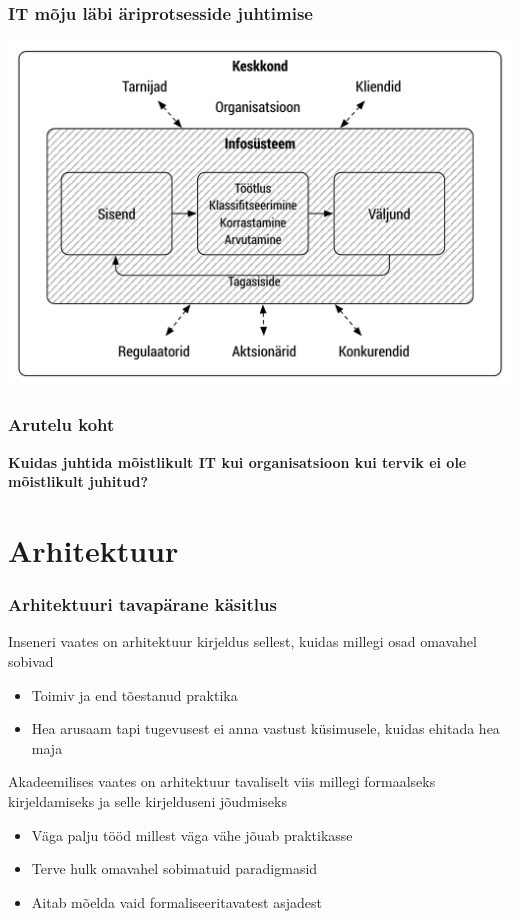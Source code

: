 \begin{frame}[fragile]
  \frametitle{IT mõju läbi äriprotsesside juhtimise}
		\begin{center}
			\includegraphics[width=.80\textwidth]{info_org.pdf}\\
		\end{center}
		\cite{laudon2000management}
\end{frame}


\begin{frame}[fragile]
  \frametitle{Arutelu koht}
		\begin{center}
			\textbf{Kuidas juhtida mõistlikult IT kui organisatsioon kui tervik ei ole mõistlikult juhitud?}
		\end{center}
\end{frame}

\section{Arhitektuur}

\begin{frame}[fragile]
  \frametitle{Arhitektuuri tavapärane käsitlus}
		Inseneri vaates on arhitektuur kirjeldus sellest, kuidas millegi osad omavahel sobivad
		\begin{itemize}
			\item Toimiv ja end tõestanud praktika
			\item Hea arusaam tapi tugevusest ei anna vastust küsimusele, kuidas ehitada hea maja
		\end{itemize}
		
		Akadeemilises vaates on arhitektuur tavaliselt viis millegi formaalseks kirjeldamiseks ja selle kirjelduseni jõudmiseks
		\begin{itemize}
			\item Väga palju tööd millest väga vähe jõuab praktikasse
			\item Terve hulk omavahel sobimatuid paradigmasid
			\item Aitab mõelda vaid formaliseeritavatest asjadest
		\end{itemize}
		
\end{frame}

